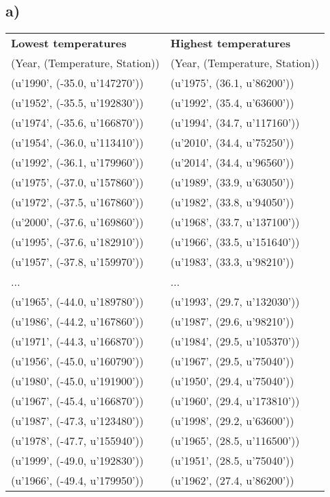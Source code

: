 \documentclass[a4paper,titlepage,12pt]{article}
\begin{document}
\subsection{a)}
\begin{tabular}{l | l}
\bf Lowest temperatures & \bf Highest temperatures \\ 
(Year, (Temperature, Station)) & (Year, (Temperature, Station)) \\
\hline
(u'1990', (-35.0, u'147270')) & (u'1975', (36.1, u'86200')) \\ 
(u'1952', (-35.5, u'192830')) & (u'1992', (35.4, u'63600')) \\ 
(u'1974', (-35.6, u'166870')) & (u'1994', (34.7, u'117160')) \\
(u'1954', (-36.0, u'113410')) & (u'2010', (34.4, u'75250')) \\
(u'1992', (-36.1, u'179960')) & (u'2014', (34.4, u'96560')) \\
(u'1975', (-37.0, u'157860')) & (u'1989', (33.9, u'63050')) \\
(u'1972', (-37.5, u'167860')) & (u'1982', (33.8, u'94050')) \\
(u'2000', (-37.6, u'169860')) & (u'1968', (33.7, u'137100')) \\
(u'1995', (-37.6, u'182910')) & (u'1966', (33.5, u'151640')) \\
(u'1957', (-37.8, u'159970')) & (u'1983', (33.3, u'98210')) \\
... & ... \\
(u'1965', (-44.0, u'189780')) & (u'1993', (29.7, u'132030')) \\
(u'1986', (-44.2, u'167860')) & (u'1987', (29.6, u'98210')) \\
(u'1971', (-44.3, u'166870')) & (u'1984', (29.5, u'105370')) \\
(u'1956', (-45.0, u'160790')) & (u'1967', (29.5, u'75040')) \\
(u'1980', (-45.0, u'191900')) & (u'1950', (29.4, u'75040')) \\
(u'1967', (-45.4, u'166870')) & (u'1960', (29.4, u'173810')) \\
(u'1987', (-47.3, u'123480')) & (u'1998', (29.2, u'63600')) \\
(u'1978', (-47.7, u'155940')) & (u'1965', (28.5, u'116500')) \\
(u'1999', (-49.0, u'192830')) & (u'1951', (28.5, u'75040')) \\
(u'1966', (-49.4, u'179950')) & (u'1962', (27.4, u'86200')) \\
\end{tabular}
\end{document}
